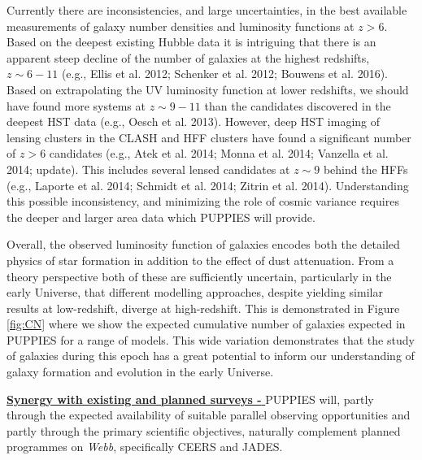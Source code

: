 \documentclass[12pt]{article}
\begin{document}
Currently there are inconsistencies, and large uncertainties, in the best available measurements of galaxy number densities and luminosity functions at $z > 6$.  Based on the deepest existing Hubble data it is intriguing that there is an apparent steep decline of the number of galaxies at the highest redshifts, $z \sim 6-11$ (e.g., Ellis et al. 2012; Schenker et al. 2012; Bouwens et al. 2016). Based on extrapolating the UV luminosity function at lower redshifts, we should have found more systems at $z \sim 9-11$ than the candidates discovered in the deepest HST data (e.g., Oesch et al. 2013).  However, deep HST imaging of lensing clusters in the CLASH and HFF clusters have found a significant number of $z>6$ candidates (e.g., Atek et al. 2014; Monna et al. 2014; Vanzella et al. 2014; update).  This includes several lensed candidates at $z\sim 9$ behind the HFFs (e.g., Laporte et al. 2014; Schmidt et al. 2014; Zitrin et al. 2014).   Understanding this possible inconsistency, and minimizing the role of cosmic variance requires the deeper and larger area data which PUPPIES will provide.

Overall, the observed luminosity function of galaxies encodes both the  detailed physics of star formation in addition to the effect of dust attenuation. From a theory perspective both of these are sufficiently uncertain, particularly in the early Universe, that different modelling approaches, despite yielding similar results at low-redshift, diverge at high-redshift. This is demonstrated in Figure \ref{fig:CN} where we show the expected cumulative number of galaxies expected in PUPPIES for a range of models. This wide variation demonstrates that the study of galaxies during this epoch has a great potential to inform our understanding of galaxy formation and evolution in the early Universe.


\noindent
\underline{\bf Synergy with existing and planned surveys - } PUPPIES will, partly through the expected availability of suitable parallel observing opportunities and partly through the primary scientific objectives, naturally complement planned programmes on \emph{Webb}, specifically CEERS and JADES. 
\end{document}
